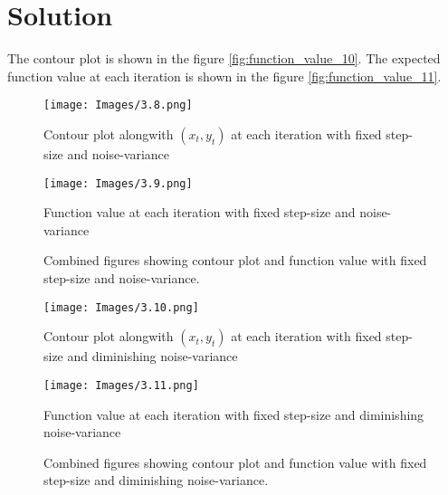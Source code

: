 \documentclass{article}
\begin{document}
\section*{Solution}

The contour plot is shown in the figure \ref{fig:function_value_10}. The expected function value at each iteration is shown in the figure \ref{fig:function_value_11}.


\begin{figure}[H]
    \centering
    \begin{minipage}{0.48\textwidth}
        \centering
        \texttt{[image: Images/3.8.png]}
        \caption{Contour plot alongwith $(x_t, y_t)$ at each iteration with fixed step-size and noise-variance}
        \label{fig:function_value_4}
    \end{minipage}
    \begin{minipage}{0.48\textwidth}
        \centering
        \texttt{[image: Images/3.9.png]}
        \caption{Function value at each iteration with fixed step-size and noise-variance}
        \label{fig:function_value_5}
    \end{minipage}
    \caption{Combined figures showing contour plot and function value with fixed step-size and noise-variance.}
    \label{fig:combined_figures_3}
\end{figure}

\begin{figure}[H]
    \centering
    \begin{minipage}{0.48\textwidth}
        \centering
        \texttt{[image: Images/3.10.png]}
        \caption{Contour plot alongwith $(x_t, y_t)$ at each iteration with fixed step-size and diminishing noise-variance}
        \label{fig:function_value_6}
    \end{minipage}
    \begin{minipage}{0.48\textwidth}
        \centering
        \texttt{[image: Images/3.11.png]}
        \caption{Function value at each iteration with fixed step-size and diminishing noise-variance}
        \label{fig:function_value_7}
    \end{minipage}
    \caption{Combined figures showing contour plot and function value with fixed step-size and diminishing noise-variance.}
    \label{fig:combined_figures_4}
\end{figure}
\end{document}
